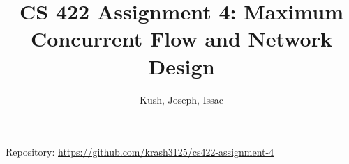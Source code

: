 \documentclass[11pt]{article}
\title{CS 422 Assignment 4: Maximum Concurrent Flow and Network Design}
\author{Kush, Joseph, Issac}
\date{}
\newcommand{\repo}{https://github.com/krash3125/cs422-assignment-4}
\begin{document}
\maketitle

\begin{center}
Repository: \url{\repo}
\end{center}



\end{document}
